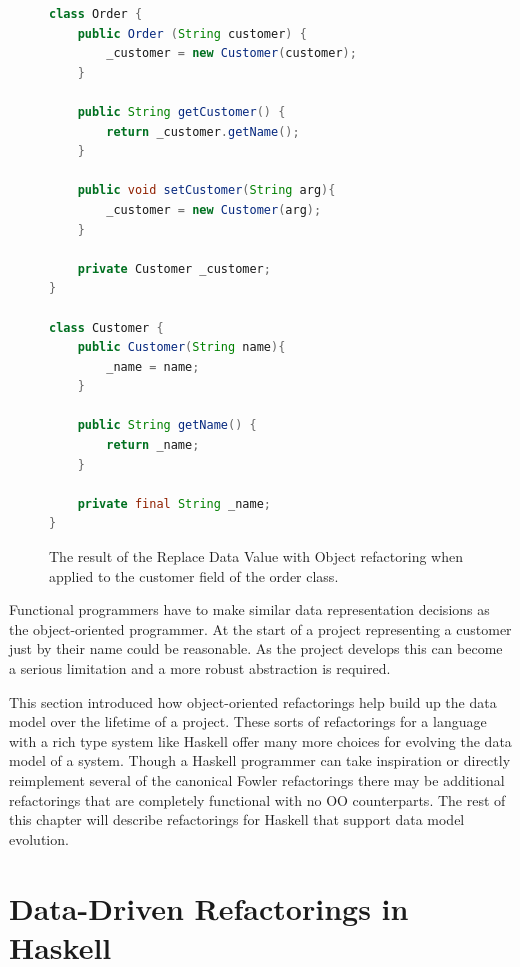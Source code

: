 \begin{figure}[t]
\begin{lstlisting}[language = java,tabsize=4]
class Order {
	public Order (String customer) {
		_customer = new Customer(customer);	
	}
	
	public String getCustomer() {
		return _customer.getName();
	}
	
	public void setCustomer(String arg){
		_customer = new Customer(arg);	
	}
	
	private Customer _customer;
}

class Customer {
	public Customer(String name){
		_name = name;
	}
	
	public String getName() {
		return _name;
	}
	
	private final String _name;
}
\end{lstlisting}
\caption{The result of the Replace Data Value with Object refactoring when applied to the customer field of the order class.}
\label{custCls}
\end{figure}

Functional programmers have to make similar data representation decisions as the object-oriented programmer. At the start of a project representing a customer just by their name could be reasonable. As the project develops this can become a serious limitation and a more robust abstraction is required. 

This section introduced how object-oriented refactorings help build up the data model over the lifetime of a project. These sorts of refactorings for a language with a rich type system like Haskell offer many more choices for evolving the data model of a system. Though a Haskell programmer can take inspiration or directly reimplement several of the canonical Fowler refactorings there may be additional refactorings that are completely functional with no OO counterparts. The rest of this chapter will describe refactorings for Haskell that support data model evolution.  

\section{Data-Driven Refactorings in Haskell}

